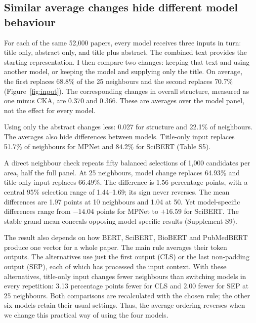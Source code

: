 \documentclass[12pt]{article}
\begin{document}
\FloatBarrier
\subsection{Similar average changes hide different model behaviour}
For each of the same 52,000 papers, every model receives three inputs in turn: title only, abstract only, and title plus abstract. The combined text provides the starting representation. I then compare two changes: keeping that text and using another model, or keeping the model and supplying only the title. On average, the first replaces 68.8\% of the 25 neighbours and the second replaces 70.7\% (Figure~\ref{fig:input}). The corresponding changes in overall structure, measured as one minus CKA, are 0.370 and 0.366. These are averages over the model panel, not the effect for every model.

Using only the abstract changes less: 0.027 for structure and 22.1\% of neighbours. The averages also hide differences between models. Title-only input replaces 51.7\% of neighbours for MPNet and 84.2\% for SciBERT (Table S5).

A direct neighbour check repeats fifty balanced selections of 1,000 candidates per area, half the full panel. At 25 neighbours, model change replaces 64.93\% and title-only input replaces 66.49\%. The difference is 1.56 percentage points, with a central 95\% selection range of 1.44--1.69; its sign never reverses. The mean differences are 1.97 points at 10 neighbours and 1.04 at 50. Yet model-specific differences range from $-14.04$ points for MPNet to $+16.59$ for SciBERT. The stable grand mean conceals opposing model-specific results (Supplement S9).

The result also depends on how BERT, SciBERT, BioBERT and PubMedBERT produce one vector for a whole paper. The main rule averages their token outputs. The alternatives use just the first output (CLS) or the last non-padding output (SEP), each of which has processed the input context. With these alternatives, title-only input changes fewer neighbours than switching models in every repetition: 3.13 percentage points fewer for CLS and 2.00 fewer for SEP at 25 neighbours. Both comparisons are recalculated with the chosen rule; the other six models retain their usual settings. Thus, the average ordering reverses when we change this practical way of using the four models.
\end{document}
